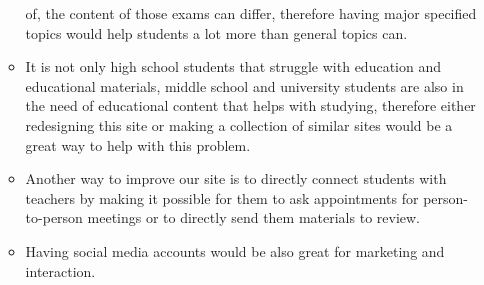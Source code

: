 \documentclass[12pt,a4paper]{article}
\begin{document}
\begin{spacing}{1.5}
\begin{itemize}
\begin{itemize}
                        of, the content of those exams can differ, therefore having major specified
                        topics would help students a lot more than general topics can.
                  \item It is not only high school students that struggle with education and
                        educational materials, middle school and university students are also in the
                        need of educational content that helps with studying, therefore either
                        redesigning this site or making a collection of similar sites would be a great
                        way to help with this problem.
                  \item Another way to improve our site is to directly connect students with teachers
                        by making it possible for them to ask appointments for person-to-person
                        meetings or to directly send them materials to review.
                  \item Having social media accounts would be also great for marketing and interaction.
              \end{itemize}
    \end{itemize}

\end{spacing}
\end{document}
